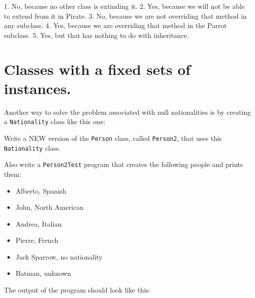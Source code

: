 \documentclass[a4paper, 11pt]{article}
\begin{document}
\begin{solution}
  1. No, because no other class is extinding it.
  2. Yes, because we will not be able to extend from it in Pirate.
  3. No, because we are not overriding that method in any subclass.
  4. Yes, because we are overriding that method in the Parrot subclass.
  5. Yes, but that has nothing to do with inheritance.
\end{solution}













\section{Classes with a fixed sets of instances.}

Another way to solve the problem associated with null nationalities is by
creating a \verb+Nationality+ class like this one:


Write a NEW version of the \verb+Person+ class, called \verb+Person2+, that
uses this \verb+Nationality+ class.

Also write a \verb+Person2Test+ program that creates the following people and
prints them:

\begin{itemize}

  \item Alberto, Spanish

  \item John, North American

  \item Andrea, Italian

  \item Pierre, French

  \item Jack Sparrow, no nationality

  \item Batman, unknown

\end{itemize}

The output of the program should look like this:

\end{document}
